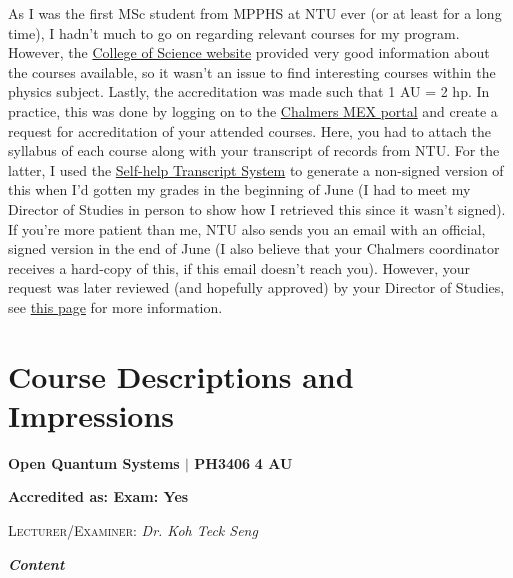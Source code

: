 As I was the first MSc student from MPPHS at NTU ever (or at least for a long time), I hadn't much to go on regarding relevant courses for my program. However, the \href{https://www.ntu.edu.sg/spms/about-us/physics/undergrad/course-info}{College of Science website} provided very good information about the courses available, so it wasn't an issue to find interesting courses within the physics subject. Lastly, the accreditation was made such that 1 AU = 2 hp. In practice, this was done by logging on to the \href{https://mex.portal.chalmers.se}{Chalmers MEX portal} and create a request for accreditation of your attended courses. Here, you had to attach the syllabus of each course along with your transcript of records from NTU. For the latter, I used the \href{https://wis.ntu.edu.sg/webexe/owa/request_transcript_und.LoginN?pType=SH}{Self-help Transcript System} to generate a non-signed version of this when I'd gotten my grades in the beginning of June (I had to meet my Director of Studies in person to show how I retrieved this since it wasn't signed). If you're more patient than me, NTU also sends you an email with an official, signed version in the end of June (I also believe that your Chalmers coordinator receives a hard-copy of this, if this email doesn't reach you). However, your request was later reviewed (and hopefully approved) by your Director of Studies, see \href{https://www.chalmers.se/utbildning/dina-studier/tjanster-och-verktyg/mex-min-vag-mot-examen/}{this page} for more information.
\newpage
\section*{Course Descriptions and Impressions}
{}


{\large{\textbf{Open Quantum Systems $\vert$ PH3406} \hfill \textbf{4 AU}}}

\vspace{-0.3cm}
\textbf{Accredited as: \hfill Exam: Yes}

{\large{\textsc{Lecturer/Examiner:} \textit{Dr. Koh Teck Seng}}} \vspace{0.3cm}

{\large{\textbf{\textit{Content}}}} 
\vspace{-0.25cm}


